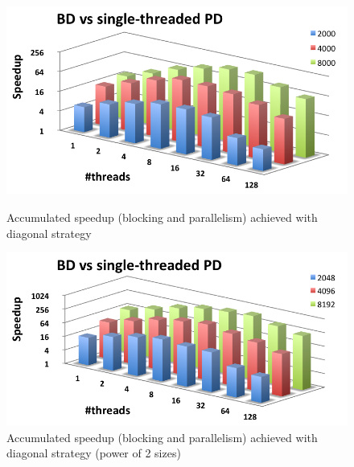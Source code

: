\documentclass[../thesis]{subfiles}
\begin{document}
	\begin{figure}[!t]
		\begin{minipage}{0.48\textwidth}
			\centering
			\includegraphics[width=\textwidth]{assets/images/multicore/blocking-multithread-speedup.png}
			\captionsetup{font=small}
			\caption{Accumulated speedup (blocking and parallelism) achieved with diagonal strategy}
			\label{fig:multicore:block:diagonal:speedup:accumulated}
		\end{minipage}
		\hfill
		\begin{minipage}{0.48\textwidth}
			\centering
			\includegraphics[width=\textwidth]{assets/images/multicore/blocking-multithread-speedup-power2.png}
			\captionsetup{font=small}
			\caption{Accumulated speedup (blocking and parallelism) achieved with diagonal strategy (power of 2 sizes)}
			\label{fig:multicore:block:diagonal:speedup:accumulated:strange}
		\end{minipage}
	\end{figure}
\end{document}
